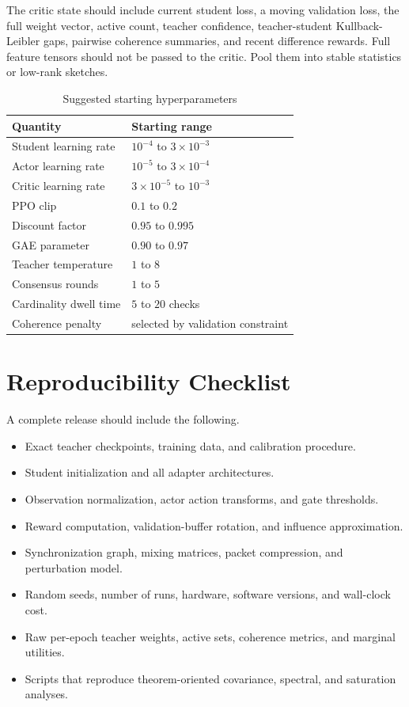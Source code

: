 \documentclass[10pt,twocolumn,a4paper]{article}
\begin{document}
The critic state should include current student loss, a moving validation loss, the full weight vector, active count, teacher confidence, teacher-student Kullback-Leibler gaps, pairwise coherence summaries, and recent difference rewards. Full feature tensors should not be passed to the critic. Pool them into stable statistics or low-rank sketches.

\begin{table}[h]
\caption{Suggested starting hyperparameters}
\label{tab:hparams}
\centering
\footnotesize
\begin{tabular}{@{}ll@{}}
\toprule
Quantity & Starting range \\
\midrule
Student learning rate & \(10^{-4}\) to \(3\times10^{-3}\) \\
Actor learning rate & \(10^{-5}\) to \(3\times10^{-4}\) \\
Critic learning rate & \(3\times10^{-5}\) to \(10^{-3}\) \\
PPO clip & \(0.1\) to \(0.2\) \\
Discount factor & \(0.95\) to \(0.995\) \\
GAE parameter & \(0.90\) to \(0.97\) \\
Teacher temperature & \(1\) to \(8\) \\
Consensus rounds & \(1\) to \(5\) \\
Cardinality dwell time & \(5\) to \(20\) checks \\
Coherence penalty & selected by validation constraint \\
\bottomrule
\end{tabular}
\end{table}

\section{Reproducibility Checklist}

A complete release should include the following.

\begin{itemize}
    \item Exact teacher checkpoints, training data, and calibration procedure.
    \item Student initialization and all adapter architectures.
    \item Observation normalization, actor action transforms, and gate thresholds.
    \item Reward computation, validation-buffer rotation, and influence approximation.
    \item Synchronization graph, mixing matrices, packet compression, and perturbation model.
    \item Random seeds, number of runs, hardware, software versions, and wall-clock cost.
    \item Raw per-epoch teacher weights, active sets, coherence metrics, and marginal utilities.
    \item Scripts that reproduce theorem-oriented covariance, spectral, and saturation analyses.
\end{itemize}
\end{document}

